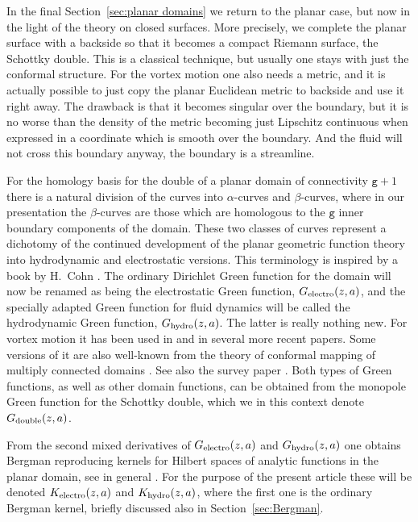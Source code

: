 \documentclass[reqno,12pt]{article}
\theoremstyle{plain}
\theoremstyle{definition}
\numberwithin{equation}{section}
\numberwithin{figure}{section}
\begin{document}
In the final Section~\ref{sec:planar domains} we return to the planar case, but now in the light of the theory on closed surfaces. 
More precisely, we complete the planar surface with a backside so that it becomes a compact Riemann surface, the Schottky double. 
This is a classical technique, but usually one stays with just the conformal structure. For the vortex motion
one also needs a metric, and it is actually possible to just copy the planar Euclidean metric to backside and use it right away.
The drawback is that it becomes singular over the boundary, but it is no worse than the density of the metric becoming
just Lipschitz continuous when expressed in a coordinate which is smooth over the boundary. And the fluid will not cross this boundary 
anyway, the boundary is a streamline.

For the homology basis for the double of a planar domain of connectivity $\texttt{g}+1$ there is a natural division 
of the curves into  $\alpha$-curves and $\beta$-curves, where in our presentation the $\beta$-curves are those
which are homologous to the $\texttt{g}$ inner boundary components of the domain. These two classes of curves
represent a dichotomy of the continued development of the planar geometric function theory into {hydrodynamic} and 
{electrostatic} versions. This terminology is inspired by a book by H.~Cohn \cite{Cohn-1980}.
The ordinary Dirichlet Green function for the domain will now be renamed as being the 
electrostatic Green function, $G_{\rm electro}(z,a)$, and the specially adapted Green function for fluid dynamics
will be called the hydrodynamic Green function, $G_{\rm hydro}(z,a)$. The latter is really nothing new.  For vortex motion
it has been used in \cite{Lin-1943, Gustafsson-1979, Flucher-Gustafsson-1997, Crowdy-Marshall-2005} and in several
more recent papers. Some versions of it are also well-known from the theory of conformal mapping of multiply connected domains
\cite{Koebe-1916, Crowdy-Marshall-2006}.  See also the survey paper \cite{Crowdy-2008}.
Both types of  Green functions, as well as other domain functions, can be obtained from
the monopole Green function for the Schottky double, which we in this context denote $G_{\rm double}(z,a)$.  

From the second mixed derivatives of $G_{\rm electro}(z,a)$ and $G_{\rm hydro}(z,a)$ one obtains
Bergman reproducing kernels for Hilbert spaces of analytic functions in the planar domain,
see in general \cite{Bergman-1970}. For the purpose of the present article these will be denoted
$K_{\rm electro}(z,a)$ and $K_{\rm hydro}(z,a)$, where the first one is the ordinary Bergman kernel, briefly discussed 
also in Section~\ref{sec:Bergman}. 
\end{document}

